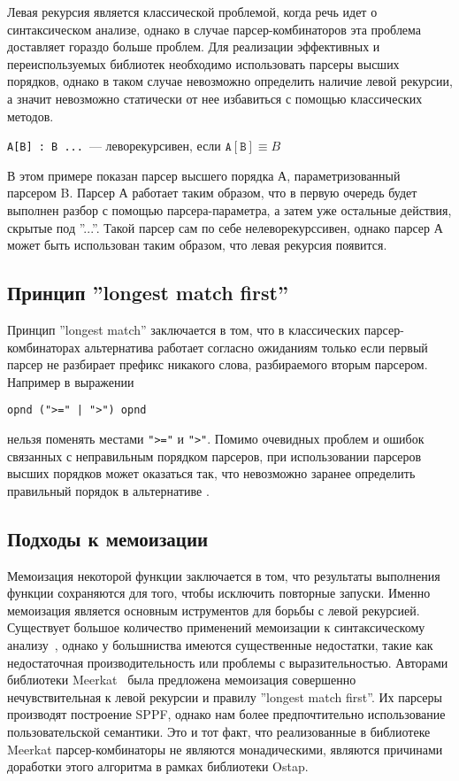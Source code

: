 \documentclass[conference]{IEEEtran}
\begin{document}
Левая рекурсия является классической проблемой, когда речь идет о синтаксическом анализе, однако в случае парсер-комбинаторов эта проблема доставляет гораздо больше проблем. Для реализации эффективных и переиспользуемых библиотек необходимо использовать парсеры высших порядков, однако в таком случае невозможно определить наличие левой рекурсии, а значит невозможно статически от нее избавиться с помощью классических методов.

\begin{center}
    \texttt{A[B] : B ...}~--- леворекурсивен, если $\mathtt{A[B]} \equiv B$
  \end{center}
  
В этом примере показан парсер высшего порядка А, параметризованный парсером B. Парсер А работает таким образом, что в первую очередь будет выполнен разбор с помощью парсера-параметра, а затем уже остальные действия, скрытые под ''...''. Такой парсер сам по себе нелеворекурссивен, однако парсер А может быть использован таким образом, что левая рекурсия появится.

\subsection{Принцип ''longest match first''}

Принцип ''longest match'' заключается в том, что в классических парсер-комбинаторах альтернатива работает согласно ожиданиям только если первый парсер не разбирает префикс никакого слова, разбираемого вторым парсером. Например в выражении 

  \begin{center}
    \verb/opnd (">=" | ">") opnd/
  \end{center}
  
нельзя поменять местами \verb/">="/ и \verb/">"/. Помимо очевидных проблем и ошибок связанных с неправильным порядком парсеров, при использовании парсеров высших порядков может оказаться так, что невозможно заранее определить правильный порядок в альтернативе
.
\subsection{Подходы к мемоизации}
Мемоизация некоторой функции заключается в том, что результаты выполнения функции сохраняются для того, чтобы исключить повторные запуски. Именно мемоизация является основным иструментов для борьбы с левой рекурсией. Существует большое количество применений мемоизации к синтаксическому анализу~\cite{frost,tratt,warth}, однако у большниства имеются существенные недостатки, такие как недостаточная производительность или проблемы с выразительностью. Авторами библиотеки Meerkat~\cite{meerkat} была предложена мемоизация совершенно нечувствительная к левой рекурсии и правилу ''longest match first''. Их парсеры производят построение SPPF, однако нам более предпочтительно использование пользовательской семантики. Это и тот факт, что реализованные в библиотеке Meerkat парсер-комбинаторы не являются монадическими, являются причинами доработки этого алгоритма в рамках библиотеки Ostap.
\end{document}
